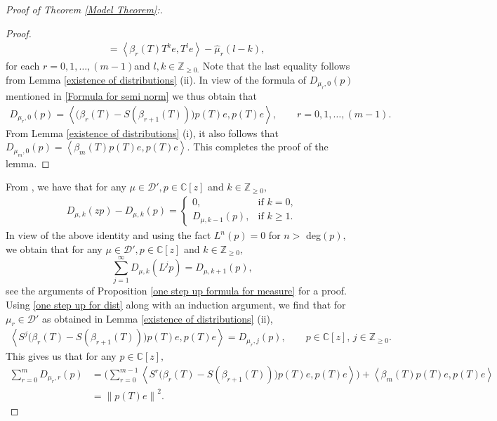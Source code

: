 \documentclass[10pt,oneside,reqno]{amsart}
\theoremstyle{definition}
\theoremstyle{remark}
\newcommand{\ip}[1]{\left\langle #1 \right\rangle}
\newcommand{\norm}[1]{\left\lVert #1 \right\rVert}
\numberwithin{equation}{section}
\begin{document}
\begin{proof}[Proof of Theorem \ref{Model Theorem}:]
\begin{proof}
\begin{align*}
        &=\ip{\beta_r(T)T^{k}e,T^le}- \hat{\mu}_r(l-k),
    \end{align*}
    for each $r=0,1,\ldots,(m-1)$and $l,k\in\mathbb Z_{\geqslant 0.}$ Note that the last equality follows from Lemma \ref{existence of distributions} (ii). In view of the formula of $D_{\mu_r,0}(p)$ mentioned in \eqref{Formula for semi norm} we thus obtain that 
    \begin{align*}
         D_{\mu_r,0}(p)= \ip{\Big (\beta_r(T)-S(\beta_{r+1}(T))\Big) p(T)e, p(T)e},\qquad r=0,1,\ldots,(m-1).
    \end{align*} 
    From Lemma \ref{existence of distributions} (i), it also follows that 
    $D_{\mu_m,0}(p)= \ip{\beta_{m}(T) p(T)e, p(T)e}.$ This completes the proof of the lemma.
    \end{proof}
From \cite[Proposition 3.4]{Rydhe19}, we have that for any $\mu\in \mathcal D',p\in \mathbb C[z]$ and $k\in \mathbb Z_{\geqslant 0},$
\begin{align*}
    D_{\mu,k}(zp)-D_{\mu,k}(p) = \begin{cases}
        0, & \mbox{if}\,\,k=0,\\
        D_{\mu,k-1}(p), & \mbox{if}\,\,k\geqslant 1.
    \end{cases}
\end{align*}
In view of the above identity and using the fact $L^n(p)=0$ for $n>$ deg$(p),$ we obtain that for  any $\mu\in \mathcal D',p\in \mathbb C[z]$ and $k\in \mathbb Z_{\geqslant 0},$
 \begin{equation}\label{one step up for dist}
	\sum_{j=1}^{\infty} D_{\mu, k} \left( L^{j}p \right) = D_{\mu, k+1} (p),
    \end{equation}
see the arguments of Proposition \ref{one step up formula for measure} for a proof.  Using \eqref{one step up for dist} along with an induction argument, we find that for $\mu_r\in \mathcal D'$ as obtained in Lemma \ref{existence of distributions} (ii),
 \begin{align*}
    \ip{S^j\Big(\beta_r(T)- S(\beta_{r+1}(T))\Big) p(T)e,p(T)e}= D_{\mu_r,j}(p),\qquad p\in\mathbb C[z],\,j\in \mathbb Z_{\geqslant 0}.
 \end{align*} 
 This gives us that for any $p\in\mathbb C[z],$
 \begin{align*}
  \sum\limits_{r=0}^{m} D_{\mu_r,r}(p) &= \Bigg (\sum\limits_{r=0}^{m-1} \ip{S^r\Big(\beta_r(T)- S(\beta_{r+1}(T))\Big) p(T)e,p(T)e}\Bigg) + \ip{\beta_{m}(T) p(T)e, p(T)e} \\
  &= \norm{p(T)e}^2. 
 \end{align*}

\end{proof}
\end{document}
